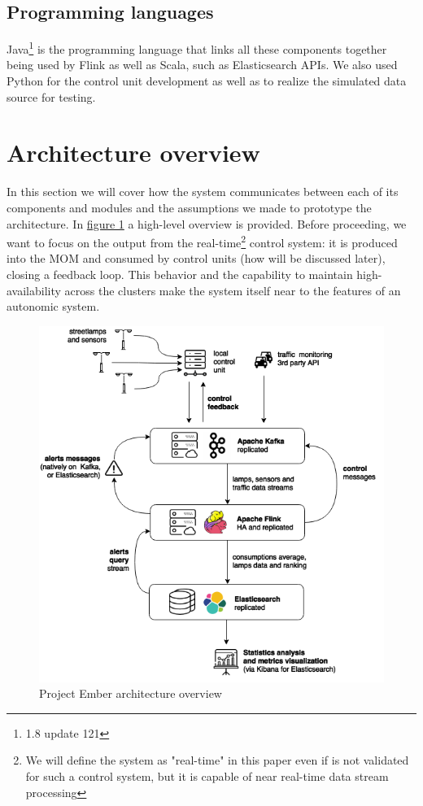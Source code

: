 \subsection{Programming languages}
Java\footnote{1.8 update 121} is the programming language that links all these components together being used by Flink as well as Scala, such as Elasticsearch APIs. We also used Python for the control unit development as well as to realize the simulated data source for testing.


\section{Architecture overview}
In this section we will cover how the system communicates between each of its components and modules and the assumptions we made to prototype the architecture. In \hyperref[fig:ember_architecture]{figure 1} a high-level overview is provided. Before proceeding, we want to focus on the output from the real-time\footnote{We will define the system as "real-time" in this paper even if is not validated for such a control system, but it is capable of near real-time data stream processing} control system: it is produced into the MOM and consumed by control units (how will be discussed later), closing a feedback loop. This behavior and the capability to maintain high-availability across the clusters make the system itself near to the features of an autonomic system.
\begin{figure}[!b]
\begin{center}
	\includegraphics[scale=0.35]{img/ember_architecture}
	\caption{Project Ember architecture overview}
	\label{fig:ember_architecture}
\end{center}
\end{figure}

